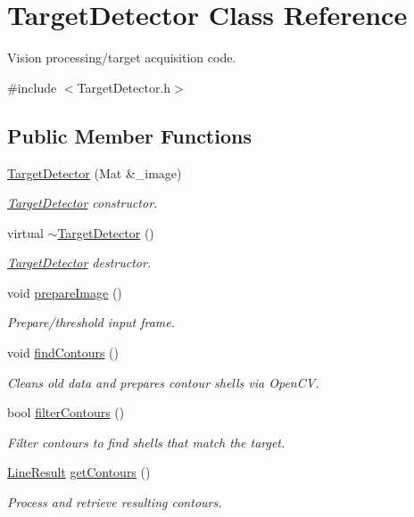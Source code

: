 \hypertarget{classTargetDetector}{}\section{Target\+Detector Class Reference}
\label{classTargetDetector}


Vision processing/target acquisition code.  




{\ttfamily \#include $<$Target\+Detector.\+h$>$}

\subsection*{Public Member Functions}
\begin{DoxyCompactItemize}
\item 
\hyperlink{classTargetDetector_a4ce81814e5632f0d7b61dffde298ba3d}{Target\+Detector} (Mat \&\+\_\+image)
\begin{DoxyCompactList}\small\item\em \hyperlink{classTargetDetector}{Target\+Detector} constructor. \end{DoxyCompactList}\item 
\hypertarget{classTargetDetector_abd40c7567100f9d44ee8aa998ce09984}{}virtual \hyperlink{classTargetDetector_abd40c7567100f9d44ee8aa998ce09984}{$\sim$\+Target\+Detector} ()\label{classTargetDetector_abd40c7567100f9d44ee8aa998ce09984}

\begin{DoxyCompactList}\small\item\em \hyperlink{classTargetDetector}{Target\+Detector} destructor. \end{DoxyCompactList}\item 
void \hyperlink{classTargetDetector_a8b4cef93d34684fae9bec516d49314a6}{prepare\+Image} ()
\begin{DoxyCompactList}\small\item\em Prepare/threshold input frame. \end{DoxyCompactList}\item 
void \hyperlink{classTargetDetector_acd578eaf953cd331926cbaf9321e51d6}{find\+Contours} ()
\begin{DoxyCompactList}\small\item\em Cleans old data and prepares contour shells via Open\+C\+V. \end{DoxyCompactList}\item 
bool \hyperlink{classTargetDetector_adbebd5675363abd6af3c111d4334f9c2}{filter\+Contours} ()
\begin{DoxyCompactList}\small\item\em Filter contours to find shells that match the target. \end{DoxyCompactList}\item 
\hyperlink{structLineResult}{Line\+Result} \hyperlink{classTargetDetector_a4e0da3406dc29ce871dbfbb233a5ab5c}{get\+Contours} ()
\begin{DoxyCompactList}\small\item\em Process and retrieve resulting contours. \end{DoxyCompactList}\end{DoxyCompactItemize}


